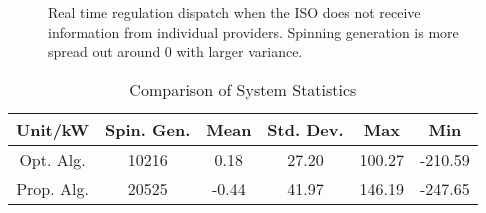 \documentclass[journal]{IEEEtran}
\begin{document}
\begin{figure}[hbt]
\centering
{}
\label{propor_result}
\caption{Real time regulation dispatch when the ISO does not receive information from individual providers. Spinning generation is more spread out around 0 with larger variance.}
\end{figure}
\begin{table}[hbt]
\caption{Comparison of System Statistics}
\centering
\begin{tabular}{|c|c|c|c|c|c|}
\hline Unit/kW & Spin. Gen. & Mean & Std. Dev. & Max & Min \\ 
\hline Opt. Alg. & 10216 & 0.18 & 27.20 & 100.27 & -210.59 \\ 
\hline Prop. Alg. & 20525 & -0.44 & 41.97 & 146.19 & -247.65 \\
\hline
\end{tabular} 
\end{table}
\end{document}
